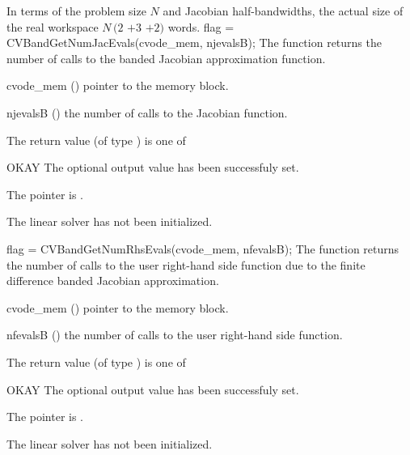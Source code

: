 {
  In terms of the problem size $N$ and Jacobian half-bandwidths, 
  the actual size of the real workspace
  $N\,(2$ $+ 3$  $+ 2)$  words.
}
{
  flag = CVBandGetNumJacEvals(cvode\_mem, njevalsB);
}
{
  The function  returns the
  number of calls to the banded Jacobian approximation function.
}
{
  \begin{args}
  \item[cvode\_mem] ()
    pointer to the {\cvode} memory block.
  \item[njevalsB] ()
    the number of calls to the Jacobian function.
  \end{args}
}
{
  The return value  (of type ) is one of
  \begin{args}
  \item[OKAY] 
    The optional output value has been successfuly set.
  \item[\Id{LIN\_NO\_MEM}]
    The  pointer is .
  \item[\Id{LIN\_NO\_LMEM}]
    The {\cvband} linear solver has not been initialized.
  \end{args}
}
{}
{
  flag = CVBandGetNumRhsEvals(cvode\_mem, nfevalsB);
}
{
  The function  returns the
  number of calls to the user right-hand side function due to the 
  finite difference banded Jacobian approximation.
}
{
  \begin{args}
  \item[cvode\_mem] ()
    pointer to the {\cvode} memory block.
  \item[nfevalsB] ()
    the number of calls to the user right-hand side function.
  \end{args}
}
{
  The return value  (of type ) is one of
  \begin{args}
  \item[OKAY] 
    The optional output value has been successfuly set.
  \item[\Id{LIN\_NO\_MEM}]
    The  pointer is .
  \item[\Id{LIN\_NO\_LMEM}]
    The {\cvband} linear solver has not been initialized.
  \end{args}
}
